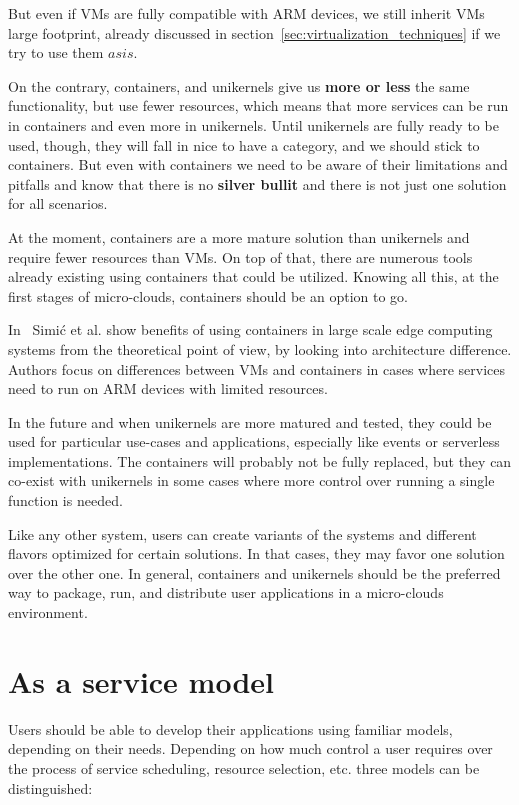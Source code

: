 But even if VMs are fully compatible with ARM devices, we still inherit VMs large footprint, already discussed in section~\ref{sec:virtualization_techniques} if we try to use them $as is$.

On the contrary, containers, and unikernels give us \textbf{more or less} the same functionality, but use fewer resources, which means that more services can be run in containers and even more in unikernels. Until unikernels are fully ready to be used, though, they will fall in nice to have a category, and we should stick to containers. But even with containers we need to be aware of their limitations and pitfalls and know that there is no \textbf{silver bullit} and there is not just one solution for all scenarios.

At the moment, containers are a more mature solution than unikernels and require fewer resources than VMs. On top of that, there are numerous tools already existing using containers that could be utilized. Knowing all this, at the first stages of micro-clouds, containers should be an option to go. 

In~\cite{inproceedingsSimic3} Simi\' c et al. show benefits of using containers in large scale edge computing systems from the theoretical point of view, by looking into architecture difference. Authors focus on differences between VMs and containers in cases where services need to run on ARM devices with limited resources.

In the future and when unikernels are more matured and tested, they could be used for particular use-cases and applications, especially like events or serverless implementations. The containers will probably not be fully replaced, but they can co-exist with unikernels in some cases where more control over running a single function is needed.

Like any other system, users can create variants of the systems and different flavors optimized for certain solutions. In that cases, they may favor one solution over the other one. In general, containers and unikernels should be the preferred way to package, run, and distribute user applications in a micro-clouds environment.
%
%
\section{As a service model}\label{sec:as_a_service_model}
%
Users should be able to develop their applications using familiar models, depending on their needs. Depending on how much control a user requires over the process of service scheduling, resource selection, etc. three models can be distinguished:
 
